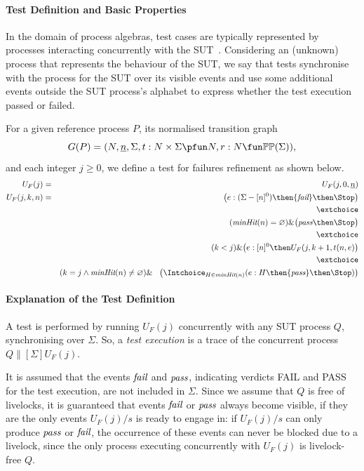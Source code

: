 \documentclass[3p,times]{elsarticle}
\newcommand{\taba}{\hspace*{3mm}}
\newcommand{\epass}{{\text{\it pass}}}
\newcommand{\efail}{{\text{\it fail}}}
\newcommand{\ii}[1]{\underline{#1}}
\newcommand{\minhits}{\text{\it minHit}}
\begin{document}
\paragraph{Test Definition and Basic Properties}
In the domain of process algebras, test cases are typically represented by
processes interacting concurrently with the
SUT~\cite{Hennessy:1988:ATP:50497}. Considering an (unknown) process that
represents the behaviour of the SUT, we say that tests synchronise with the
process for the SUT over its visible events and use some additional events
outside the SUT process's alphabet to express whether the test execution
passed or failed.

For a given reference process $P$, its normalised transition graph
$$
G(P) = ( N, \ii n, \Sigma, t : N\times\Sigma \pfun N, r : N \fun \mathbb{P}\mathbb{P}(\Sigma)),
$$
and each integer $j\ge 0$, we define a test for failures refinement as shown
below.
%
\begin{eqnarray}
\label{eq:UFP}
U_F(j) & = & U_F(j,0,\ii n)
\\
U_F(j,k,n) & = & \big(e:(\Sigma - [n]^0)  \then \efail\then \Stop \big)
\label{eq:ufa}
\\ & & \extchoice \nonumber
\\ & & (\minhits(n) =   \varnothing  )    \&   \big( \epass \then \Stop \big)
\label{eq:ufb}
\\ & & \extchoice \nonumber
\\ & & (k < j) \& \big(e:[n]^0   \then U_F(j,k+1,t(n,e) \big)
\label{eq:ufc}
\\ & & \extchoice \nonumber
\\ & & (k = j \wedge \minhits(n)\neq\varnothing) \& \taba \big( \Intchoice_{H\in\minhits(n)} (e:H   \then \epass \then\Stop   )  \big)
\label{eq:ufd}
\end{eqnarray}

\paragraph{Explanation of the Test Definition} A test  is performed by running
$U_F(j)$ concurrently with any SUT process $Q$, synchronising over $\Sigma$.
So, a \emph{test execution} is a trace of the concurrent process
$Q\parallel[\Sigma] U_F(j)$.

It is assumed that the events $\efail$ and $\epass$, indicating verdicts FAIL
and PASS for the test execution, are not included in $\Sigma$. Since we
assume that $Q$ is free of livelocks, it is guaranteed that events $\efail$
or $\epass$ always become visible, if they are the only events $U_F(j)/s$ is
ready to engage in: if $U_F(j)/s$ can only produce $\epass$ or $\efail$, the
occurrence of these events can never be blocked due to a livelock, since the only
  process executing concurrently with  $U_F(j)$  is livelock-free  $Q$.
\end{document}
